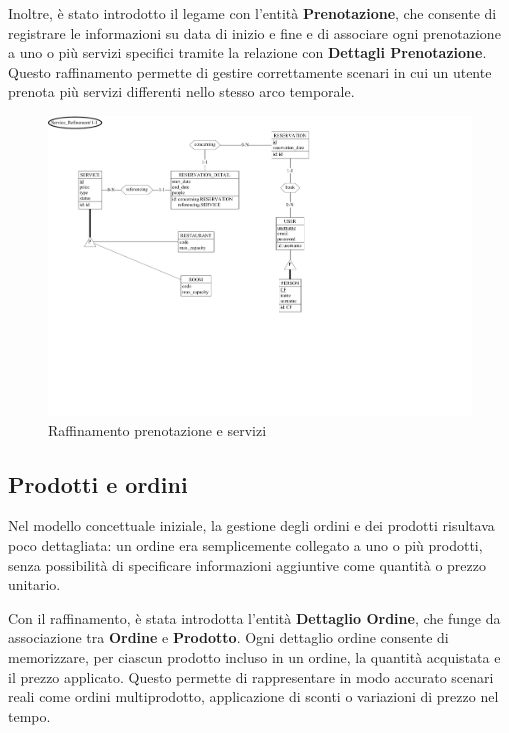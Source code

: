 \documentclass[a4paper,12pt]{report}
\begin{document}
\vspace{\baselineskip}
Inoltre, è stato introdotto il legame con l'entità \textbf{Prenotazione}, che consente di 
registrare le informazioni su data di inizio e fine e di associare ogni prenotazione a uno o 
più servizi specifici tramite la relazione con \textbf{Dettagli Prenotazione}. Questo
raffinamento permette di gestire correttamente scenari in cui un utente prenota più servizi 
differenti nello stesso arco temporale.
\begin{figure}[H]
	\centering
	\includegraphics[width=\textwidth, trim=0 200pt 300pt 0, clip]{./schemas/refinements/service.pdf}
	\caption{Raffinamento prenotazione e servizi}
	\label{fig:raffinamento-servizi-prenotazione}
\end{figure}

\newpage
\subsection{Prodotti e ordini}
Nel modello concettuale iniziale, la gestione degli ordini e dei prodotti risultava poco 
dettagliata: un ordine era semplicemente collegato a uno o più prodotti, senza possibilità di 
specificare informazioni aggiuntive come quantità o prezzo unitario.

\vspace{\baselineskip}
Con il raffinamento, è stata introdotta l'entità \textbf{Dettaglio Ordine}, che funge da 
associazione tra \textbf{Ordine} e \textbf{Prodotto}. Ogni dettaglio ordine consente di 
memorizzare, per ciascun prodotto incluso in un ordine, la quantità acquistata e il prezzo 
applicato. Questo permette di rappresentare in modo accurato scenari reali come ordini
multiprodotto, applicazione di sconti o variazioni di prezzo nel tempo.
\end{document}
